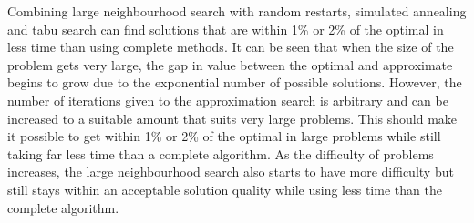 Combining large neighbourhood search with random restarts, simulated annealing and tabu search can find solutions that are within 1\% or 2\% of the optimal in less time than using complete methods. It can be seen that when the size of the problem gets very large, the gap in value between the optimal and approximate begins to grow due to the exponential number of possible solutions. However, the number of iterations given to the approximation search is arbitrary and can be increased to a suitable amount that suits very large problems. This should make it possible to get within 1\% or 2\% of the optimal in large problems while still taking far less time than a complete algorithm. As the difficulty of problems increases, the large neighbourhood search also starts to have more difficulty but still stays within an acceptable solution quality while using less time than the complete algorithm.